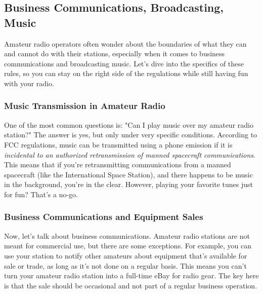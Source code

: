 \subsection{Business Communications, Broadcasting, Music}
\label{subsec:biz-broadcast-music}

Amateur radio operators often wonder about the boundaries of what they can and cannot do with their stations, especially when it comes to business communications and broadcasting music. Let's dive into the specifics of these rules, so you can stay on the right side of the regulations while still having fun with your radio.

\subsubsection*{Music Transmission in Amateur Radio}
One of the most common questions is: "Can I play music over my amateur radio station?" The answer is yes, but only under very specific conditions. According to FCC regulations, music can be transmitted using a phone emission if it is \textit{incidental to an authorized retransmission of manned spacecraft communications}. This means that if you're retransmitting communications from a manned spacecraft (like the International Space Station), and there happens to be music in the background, you're in the clear. However, playing your favorite tunes just for fun? That's a no-go.


\subsubsection*{Business Communications and Equipment Sales}
Now, let's talk about business communications. Amateur radio stations are not meant for commercial use, but there are some exceptions. For example, you can use your station to notify other amateurs about equipment that's available for sale or trade, as long as it's not done on a regular basis. This means you can't turn your amateur radio station into a full-time eBay for radio gear. The key here is that the sale should be occasional and not part of a regular business operation.

